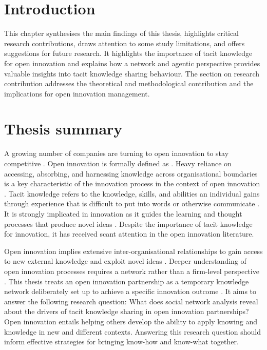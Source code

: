 
\section{Introduction}

This chapter synthesises the main findings of this thesis, highlights critical research contributions, draws attention to  some study limitations, and offers suggestions for future research. It highlights the importance of tacit knowledge for open innovation and explains how a network and agentic perspective provides valuable insights into tacit knowledge sharing behaviour. The section on research contribution addresses the theoretical and methodological contribution and the implications for open innovation management. 

\section{Thesis summary}

A growing number of companies are turning to open innovation to stay competitive \citep{stanko2017under}. Open innovation is formally defined as  \citep{chesbrough2014explicating}. Heavy reliance on accessing, absorbing, and harnessing knowledge across organisational boundaries is a key characteristic of the innovation process in the context of open innovation \citep{chesbrough2012open}. Tacit knowledge refers to the knowledge, skills, and abilities an individual gains through experience that is difficult to put into words or otherwise communicate \citep{kreutz2014catalyzing}. It is strongly implicated in innovation as it guides the learning and thought processes that produce novel ideas \citep{leonard1998role,lam2000tacit}. Despite the importance of tacit knowledge for innovation, it has received scant attention in the open innovation literature. \medskip

Open innovation implies extensive inter-organisational relationships to gain access to new external knowledge and exploit novel ideas \citep{chiaroni2011open}. Deeper understanding of open innovation processes requires a network rather than a firm-level perspective \citep{fichter2009innovation,martinez2014analysis,yun2016network}. This thesis treats an open innovation partnership as a temporary knowledge network deliberately set up to achieve a specific innovation outcome \citep{turner2003natureoftheproject,perez2013temporary,terhorst2018tacit}. It aims to answer the following research question: What does social network analysis reveal about the drivers of tacit knowledge sharing in open innovation partnerships? Open innovation entails helping others develop the ability to apply knowing and knowledge in new and different contexts. Answering this research question should inform effective strategies for bringing know-how and know-what together. \medskip

